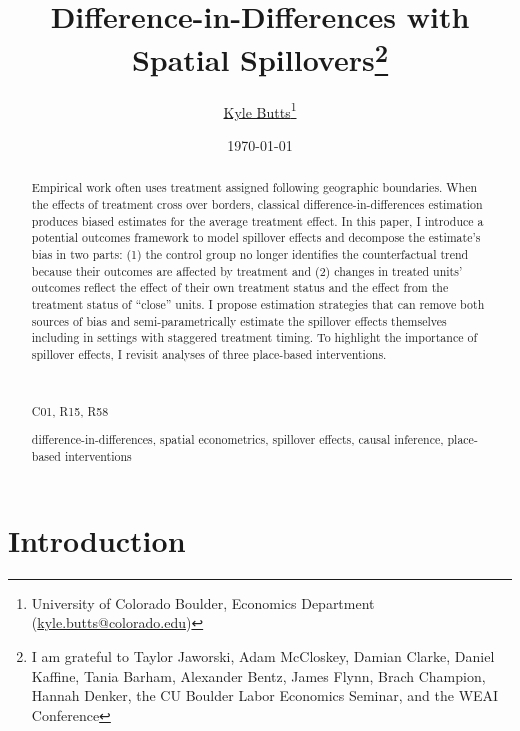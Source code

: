 \documentclass[11pt]{article}
\title{Difference-in-Differences with Spatial Spillovers\thanks{I am grateful to Taylor Jaworski, Adam McCloskey, Damian Clarke, Daniel Kaffine, Tania Barham, Alexander Bentz, James Flynn, Brach Champion, Hannah Denker, the CU Boulder Labor Economics Seminar, and the WEAI Conference}}
\author{\href{https://kylebutts.com/}{Kyle Butts}\thanks{University of Colorado Boulder, Economics Department (\href{mailto:kyle.butts@colorado.edu}{kyle.butts@colorado.edu})}}
\date{\today}
\begin{document}
\begin{titlepage}
    \maketitle

    \begin{abstract}
        {\small
        Empirical work often uses treatment assigned following geographic boundaries. When the effects of treatment cross over borders, classical difference-in-differences estimation produces biased estimates for the average treatment effect. In this paper, I introduce a potential outcomes framework to model spillover effects and decompose the estimate's bias in two parts: (1) the control group no longer identifies the counterfactual trend because their outcomes are affected by treatment and (2) changes in treated units' outcomes reflect the effect of their own treatment status and the effect from the treatment status of ``close'' units. I propose estimation strategies that can remove both sources of bias and semi-parametrically estimate the spillover effects themselves including in settings with staggered treatment timing. To highlight the importance of spillover effects, I revisit analyses of three place-based interventions.
    
        \par~\par\noindent
         C01, R15, R58
        \par
         difference-in-differences, spatial econometrics, spillover effects, causal inference, place-based interventions
        \par\vspace{-2.5mm}
        }
    \end{abstract}
\end{titlepage}



\section{Introduction}
\end{document}
